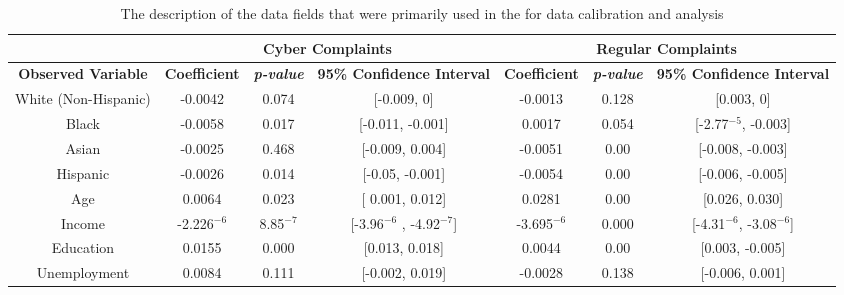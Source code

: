 \documentclass[conference]{IEEEtran}
\begin{document}
\begin{table}[h]
\noindent
\centering
\begin{tabular}{c||c|c|c||c|c|c}
\hline
\multicolumn{1}{c||}{\bfseries } & \multicolumn{3}{c||}{\bfseries Cyber Complaints} & \multicolumn{3}{c}{\bfseries Regular Complaints}\\
\hline
\bfseries Observed Variable & \bfseries Coefficient & \bfseries \emph{p-value} & \bfseries 95\% Confidence Interval & \bfseries Coefficient & \bfseries \emph{p-value} & \bfseries 95\% Confidence Interval \\
\hline
White (Non-Hispanic) & -0.0042 & 0.074 & [-0.009, 0] & -0.0013 &  0.128 & [0.003,  0]\\
\hline
Black & -0.0058 & 0.017 & [-0.011, -0.001] & 0.0017 & 0.054 & [-2.77$^{-5}$, -0.003]\\
\hline
Asian & -0.0025 & 0.468 & [-0.009, 0.004] & -0.0051 & 0.00 & [-0.008, -0.003]\\
\hline
Hispanic & -0.0026 & 0.014 & [-0.05, -0.001] & -0.0054 & 0.00 & [-0.006, -0.005]\\
\hline
Age & 0.0064 & 0.023 & [ 0.001, 0.012] & 0.0281 & 0.00 & [0.026, 0.030]\\
\hline
Income & -2.226$^{-6}$ & 8.85$^{-7}$ & [-3.96$^{-6}$ , -4.92$^{-7}$] & -3.695$^{-6}$ & 0.000  & [-4.31$^{-6}$, -3.08$^{-6}$]\\
\hline
Education & 0.0155 & 0.000 & [0.013, 0.018] & 0.0044 & 0.00 & [0.003, -0.005]\\
\hline
Unemployment & 0.0084 & 0.111 & [-0.002, 0.019] & -0.0028 & 0.138 & [-0.006, 0.001]\\
\hline
\end{tabular}

\vspace{8pt}
\caption{The description of the data fields that were primarily used in the for data calibration and analysis}\label{regressions}
\vspace{-20pt}
\end{table}
\end{document}
